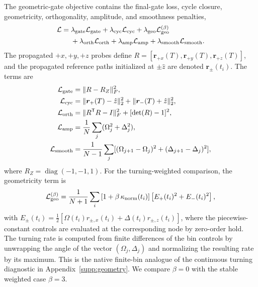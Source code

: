 \documentclass[aps,prx,reprint,superscriptaddress,nofootinbib,longbibliography,floatfix,showkeys]{revtex4-2}
\newcommand{\rr}{\bm r}
\newcommand{\appsecref}[1]{Appendix~\hyperref[#1]{\ref*{#1}}}
\begin{document}
The geometric-gate objective contains the final-gate loss, cycle closure,
geometricity, orthogonality, amplitude, and smoothness penalties,
\begin{equation}
    \begin{aligned}
    \mathcal L={}&\lambda_{\rm gate}\mathcal L_{\rm gate}
    +\lambda_{\rm cyc}\mathcal L_{\rm cyc}
    +\lambda_{\rm geo}\mathcal L_{\rm geo}^{(\beta)}\\
    &{}+\lambda_{\rm orth}\mathcal L_{\rm orth}
    +\lambda_{\rm amp}\mathcal L_{\rm amp}
    +\lambda_{\rm smooth}\mathcal L_{\rm smooth}.
    \end{aligned}
\end{equation}
The propagated $+x,+y,+z$ probes define
$R=[\rr_{+x}(T),\rr_{+y}(T),\rr_{+z}(T)]$, and the propagated reference
paths initialized at $\pm\hat z$ are denoted $\rr_\pm(t_i)$.  The terms are
\begin{equation}
\begin{aligned}
    \mathcal L_{\rm gate}&=\|R-R_Z\|_F^2,\\
    \mathcal L_{\rm cyc}&=\|\rr_+(T)-\hat z\|_2^2
        +\|\rr_-(T)+\hat z\|_2^2,\\
    \mathcal L_{\rm orth}&=\|R^{\mathsf T}R-I\|_F^2
        +[\det(R)-1]^2,\\
    \mathcal L_{\rm amp}&=\frac{1}{N}\sum_j(\Omega_j^2+\Delta_j^2),\\
    \mathcal L_{\rm smooth}&=\frac{1}{N-1}\sum_j
        [(\Omega_{j+1}-\Omega_j)^2+(\Delta_{j+1}-\Delta_j)^2],
\end{aligned}
\end{equation}
where $R_Z=\operatorname{diag}(-1,-1,1)$.  For the turning-weighted
comparison, the geometricity term is
\begin{equation}
    \mathcal L_{\rm geo}^{(\beta)}
    =
    \frac{1}{N+1}\sum_i
    \left[1+\beta\,\kappa_{\rm norm}(t_i)\right]
    \left[E_+(t_i)^2+E_-(t_i)^2\right],
\end{equation}
with $E_\pm(t_i)=\tfrac12[\Omega(t_i)r_{\pm,x}(t_i)+\Delta(t_i)r_{\pm,z}(t_i)]$,
where the piecewise-constant controls are evaluated at the corresponding
node by zero-order hold.  The turning rate is computed from finite
differences of the bin controls by unwrapping the angle of the vector
$(\Omega_j,\Delta_j)$ and normalizing the resulting rate by its maximum.
This is the native finite-bin analogue of the continuous turning diagnostic
in \appsecref{supp:geometry}.  We compare $\beta=0$ with the stable
weighted case $\beta=3$.
\end{document}
